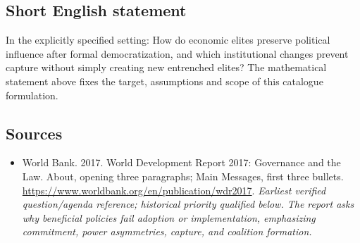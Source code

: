 \documentclass[11pt]{article}
\begin{document}
\subsection{Short English statement}
In the explicitly specified setting: How do economic elites preserve political influence after formal democratization, and which institutional changes prevent capture without simply creating new entrenched elites? The mathematical statement above fixes the target, assumptions and scope of this catalogue formulation.

\subsection{Sources}
\begin{itemize}\raggedright
\item[\textnormal{[S1]}]\hypertarget{source:30007667:1}{} World Bank. 2017. World Development Report 2017: Governance and the Law. About, opening three paragraphs; Main Messages, first three bullets.
\url{https://www.worldbank.org/en/publication/wdr2017}.
{\small\textit{Earliest verified question/agenda reference; historical priority qualified below. The report asks why beneficial policies fail adoption or implementation, emphasizing commitment, power asymmetries, capture, and coalition formation.}}
\end{itemize}
\end{document}
